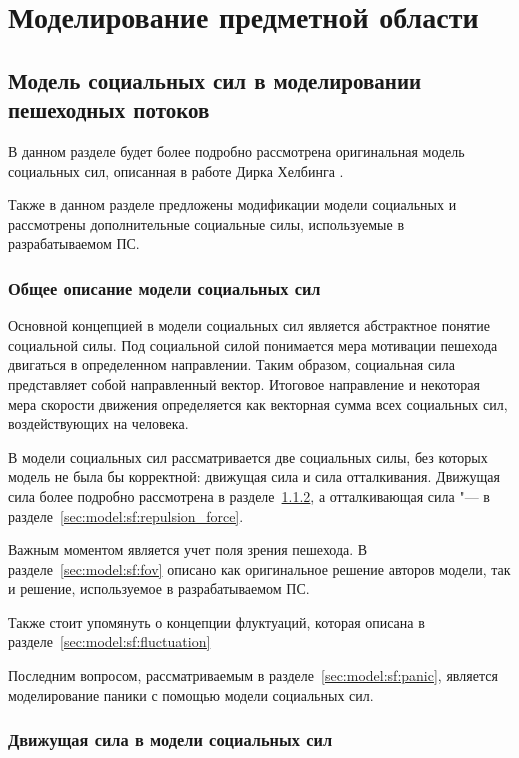 \section{Моделирование предметной области}
\label{sec:model}

\subsection{Модель социальных сил в моделировании пешеходных потоков}
\label{sec:model:sf}

В данном разделе будет более подробно рассмотрена оригинальная модель социальных сил, описанная в работе Дирка Хелбинга \cite{helbing_social_force}.

Также в данном разделе предложены модификации модели социальных и рассмотрены дополнительные социальные силы, используемые в разрабатываемом ПС.

\subsubsection{Общее описание модели социальных сил}
\label{sec:model:sf:description}

Основной концепцией в модели социальных сил является абстрактное понятие социальной силы.
Под социальной силой понимается мера мотивации пешехода двигаться в определенном направлении.
Таким образом, социальная сила представляет собой направленный вектор.
Итоговое направление и некоторая мера скорости движения определяется как векторная сумма всех социальных сил, воздействующих на человека.

В модели социальных сил рассматривается две социальных силы, без которых модель не была бы корректной: движущая сила и сила отталкивания.
Движущая сила более подробно рассмотрена в разделе~\ref{sec:model:sf:moving_force}, а отталкивающая сила "--- в разделе~\ref{sec:model:sf:repulsion_force}.

Важным моментом является учет поля зрения пешехода. В разделе~\ref{sec:model:sf:fov} описано как оригинальное решение авторов модели, так и решение, используемое в разрабатываемом ПС.

Также стоит упомянуть о концепции флуктуаций, которая описана в разделе~\ref{sec:model:sf:fluctuation}

Последним вопросом, рассматриваемым в разделе~\ref{sec:model:sf:panic}, является моделирование паники с помощью модели социальных сил.

\subsubsection{Движущая сила в модели социальных сил}
\label{sec:model:sf:moving_force}

